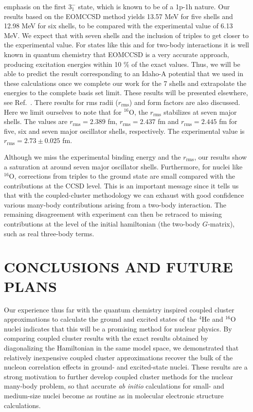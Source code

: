 \documentclass[fleqn,12pt,twoside]{article}
\begin{document}
emphasis on the first $3_1^-$ state, which is known to be of a 1p-1h nature.
Our results based on the EOMCCSD method yields
13.57 MeV for five shells and 12.98 MeV for six shells, to be compared
with the experimental value of 6.13 MeV. We expect that with seven shells
and the  inclusion of triples to get closer to the experimental value.
For states like this and for two-body interactions it is
well known in quantum chemistry that EOMCCSD is a very accurate
approach, producing excitation energies within 10 \% of the exact values.
Thus, we will be able to predict the result corresponding to
an Idaho-A potential that we used in these calculations once we complete
our work for the 7 shells and extrapolate the energies to the complete
basis set limit. These results will be presented elsewhere, see
Ref.~\cite{marta2004}. There results for rms radii ($r_{\mathrm{rms}}$) 
and form factors are also discussed.
Here we limit ourselves to note that for $^{16}$O, the   $r_{\mathrm{rms}}$  
stabilizes at seven major shells.
The values are $r_{\mathrm{rms}}=2.389$ fm, $r_{\mathrm{rms}}=2.437$ fm and
$r_{\mathrm{rms}}=2.445$ fm for five, six and seven major oscillator shells, 
respectively.
The experimental value is  $r_{\mathrm{rms}}=2.73\pm 0.025$ fm. 

Although we miss the experimental binding energy and the $r_{\mathrm{rms}}$, our results
show a saturation at around seven major oscillator shells. Furthermore, for nuclei like 
$^{16}$O, corrections from triples to the ground state are small compared with the
contributions at the CCSD level. This is an important message since it tells us that
with the coupled-cluster methodology we can exhaust with good confidence various 
many-body contributions arising from a two-body interaction. 
The remaining disagreement with experiment can then be retraced to missing contributions
at the level of the initial hamiltonian (the two-body $G$-matrix), 
such as real three-body terms.


\section{CONCLUSIONS AND FUTURE PLANS}

Our experience thus far with the 
quantum chemistry inspired coupled cluster
approximations to calculate the ground and excited states of the
$^{4}$He and $^{16}$O nuclei indicates that this will be a promising
method for nuclear physics.  By comparing coupled cluster results
with the exact results obtained by diagonalizing the Hamiltonian in
the same model space, we demonstrated that relatively inexpensive
coupled cluster approximations recover the bulk of the nucleon
correlation effects in ground- and excited-state nuclei. These results
are a strong motivation to further develop coupled cluster methods for
the nuclear many-body problem, so that accurate {\it ab initio}
calculations for small- and medium-size nuclei become as routine as in
molecular electronic structure calculations.
\end{document}
